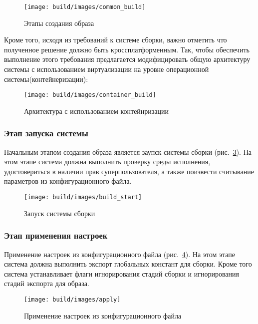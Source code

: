 \begin{figure}[h!]
  \centering
  \setlength{\fboxsep}{5pt}
  \texttt{[image: build/images/common\_build]}
  \caption{Этапы создания образа}\label{fig: common_build}
\end{figure}


\newpage
Кроме того, исходя из требований к системе сборки, важно отметить что полученное решение должно быть кроссплатформенным.
Так, чтобы обеспечить выполнение этого требования предлагается модифицировать общую архитектуру системы с использованием виртуализации на уровне операционной системы(контейнеризации):

\begin{figure}[h!]
  \centering
  \setlength{\fboxsep}{5pt}
  \texttt{[image: build/images/container\_build]}
  \caption{Архитектура с использованием контейнризации}\label{fig: container_build}
\end{figure}

\newpage
\subsubsection{Этап запуска системы}

Начальным этапом создания образа является заупск системы сборки (рис.~\ref{fig: build_start}).
  На этом этапе система должна выполнить проверку среды исполнения, удостовериться в наличии прав суперпользователя, а также поизвести считывание параметров из конфигурационного файла.
  \begin{figure}[h!]
    \centering
    \setlength{\fboxsep}{5pt}
    \texttt{[image: build/images/build\_start]}
    \caption{Запуск системы сборки}\label{fig: build_start}
  \end{figure}

\newpage
\subsubsection{Этап применения настроек}
Применение настроек из конфигурационного файла (рис.~\ref{fig: apply}). На этом этапе система должна выполнить экспорт глобальных констант для сборки.
Кроме того система устанавливает флаги игнорирования стадий сборки и игнорирования стадий экспорта для образа.
\begin{figure}[h!]
  \centering
  \setlength{\fboxsep}{5pt}
  \texttt{[image: build/images/apply]}
  \caption{Применение настроек из конфигурационного файла}\label{fig: apply}
\end{figure}

